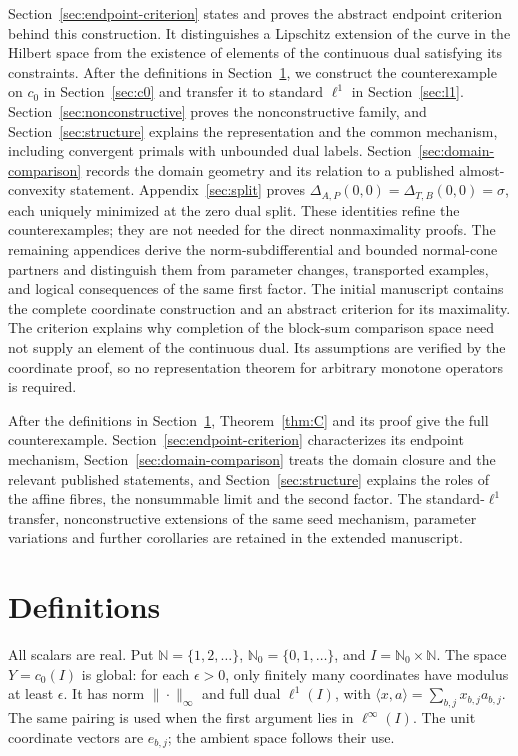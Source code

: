 \documentclass[11pt]{article}
\newcommand{\N}{\mathbb N}
\newcommand{\Nzero}{\mathbb N_0}
\newcommand{\pair}[2]{\langle #1,#2\rangle}
\begin{document}
Section~\ref{sec:endpoint-criterion} states and proves the abstract
endpoint criterion behind this construction. It distinguishes a Lipschitz
extension of the curve in the Hilbert space from the existence of elements
of the continuous dual satisfying its constraints.
After the definitions in Section~\ref{sec:definitions}, we construct the
counterexample on $c_0$ in Section~\ref{sec:c0} and transfer it to standard
$\ell^1$ in Section~\ref{sec:l1}.
Section~\ref{sec:nonconstructive} proves the nonconstructive family,
and Section~\ref{sec:structure} explains the representation and the
common mechanism, including convergent primals with unbounded dual labels.
Section~\ref{sec:domain-comparison} records the domain geometry and its
relation to a published almost-convexity statement.
Appendix~\ref{sec:split} proves
$\Delta_{A,P}(0,0)=\Delta_{T,B}(0,0)=\sigma$, each uniquely minimized
at the zero dual split. These identities refine the counterexamples;
they are not needed for the direct nonmaximality proofs.
\ifdefined\expandedversion
The remaining appendices derive the norm-subdifferential and bounded
normal-cone partners and distinguish them from parameter changes,
transported examples, and logical consequences of the same first factor.
\fi
\else
The initial manuscript contains the complete coordinate construction
and an abstract criterion for its maximality. The criterion explains
why completion of the block-sum comparison space need not supply an
element of the continuous dual. Its assumptions are verified by the
coordinate proof, so no representation theorem for arbitrary monotone
operators is required.

After the definitions in Section~\ref{sec:definitions},
Theorem~\ref{thm:C} and its proof give the full counterexample.
Section~\ref{sec:endpoint-criterion} characterizes its endpoint
mechanism, Section~\ref{sec:domain-comparison} treats the domain closure
and the relevant published statements, and Section~\ref{sec:structure}
explains the roles of the affine fibres, the nonsummable limit and the
second factor. The standard-$\ell^1$ transfer, nonconstructive extensions
of the same seed mechanism, parameter variations and further corollaries
are retained in the extended manuscript.
\fi

\section{Definitions}
\label{sec:definitions}
All scalars are real. Put $\N=\{1,2,\ldots\}$, $\Nzero=\{0,1,\ldots\}$,
and $I=\Nzero\times\N$. The space $Y=c_0(I)$ is global: for each
$\epsilon>0$, only finitely many coordinates have modulus at least
$\epsilon$. It has norm $\|\cdot\|_\infty$ and full dual $\ell^1(I)$,
with $\pair{x}{a}=\sum_{b,j}x_{b,j}a_{b,j}$.
The same pairing is used when the first argument lies in $\ell^\infty(I)$.
The unit coordinate vectors are $e_{b,j}$; the ambient space follows their use.
\end{document}
